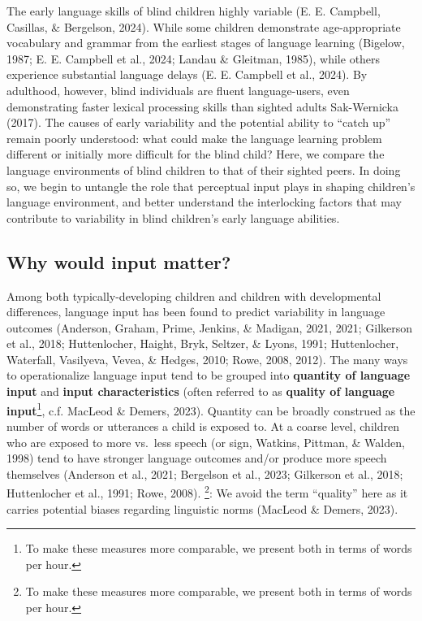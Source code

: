 \documentclass[
  man]{apa6}
\begin{document}
The early language skills of blind children highly variable (E. E. Campbell, Casillas, \& Bergelson, 2024). While some children demonstrate age-appropriate vocabulary and grammar from the earliest stages of language learning (Bigelow, 1987; E. E. Campbell et al., 2024; Landau \& Gleitman, 1985), while others experience substantial language delays (E. E. Campbell et al., 2024). By adulthood, however, blind individuals are fluent language-users, even demonstrating faster lexical processing skills than sighted adults Sak-Wernicka (2017). The causes of early variability and the potential ability to ``catch up'' remain poorly understood: what could make the language learning problem different or initially more difficult for the blind child? Here, we compare the language environments of blind children to that of their sighted peers. In doing so, we begin to untangle the role that perceptual input plays in shaping children's language environment, and better understand the interlocking factors that may contribute to variability in blind children's early language abilities.

\hypertarget{why-would-input-matter}{%
\subsection{Why would input matter?}\label{why-would-input-matter}}

Among both typically-developing children and children with developmental differences, language input has been found to predict variability in language outcomes (Anderson, Graham, Prime, Jenkins, \& Madigan, 2021, 2021; Gilkerson et al., 2018; Huttenlocher, Haight, Bryk, Seltzer, \& Lyons, 1991; Huttenlocher, Waterfall, Vasilyeva, Vevea, \& Hedges, 2010; Rowe, 2008, 2012). The many ways to operationalize language input tend to be grouped into \textbf{quantity of language input} and \textbf{input characteristics} (often referred to as \textbf{quality of language input}\footnote{To make these measures more comparable, we present both in terms of words per hour.}, c.f. MacLeod \& Demers, 2023). Quantity can be broadly construed as the number of words or utterances a child is exposed to. At a coarse level, children who are exposed to more vs.~less speech (or sign, Watkins, Pittman, \& Walden, 1998) tend to have stronger language outcomes and/or produce more speech themselves (Anderson et al., 2021; Bergelson et al., 2023; Gilkerson et al., 2018; Huttenlocher et al., 1991; Rowe, 2008).
\footnote{To make these measures more comparable, we present both in terms of words per hour.}: We avoid the term ``quality'' here as it carries potential biases regarding linguistic norms (MacLeod \& Demers, 2023).
\end{document}
